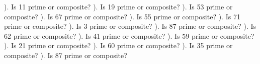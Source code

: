 \documentclass{article}%
\begin{document}
). Is 11 prime or composite?%
\newline%
\newline%
). Is 19 prime or composite?%
\newline%
\newline%
). Is 53 prime or composite?%
\newline%
\newline%
). Is 67 prime or composite?%
\newline%
\newline%
). Is 55 prime or composite?%
\newline%
\newline%
). Is 71 prime or composite?%
\newline%
\newline%
). Is 3 prime or composite?%
\newline%
\newline%
). Is 87 prime or composite?%
\newline%
\newline%
). Is 62 prime or composite?%
\newline%
\newline%
). Is 41 prime or composite?%
\newline%
\newline%
). Is 59 prime or composite?%
\newline%
\newline%
). Is 21 prime or composite?%
\newline%
\newline%
). Is 60 prime or composite?%
\newline%
\newline%
). Is 35 prime or composite?%
\newline%
\newline%
). Is 87 prime or composite?%
\end{document}
